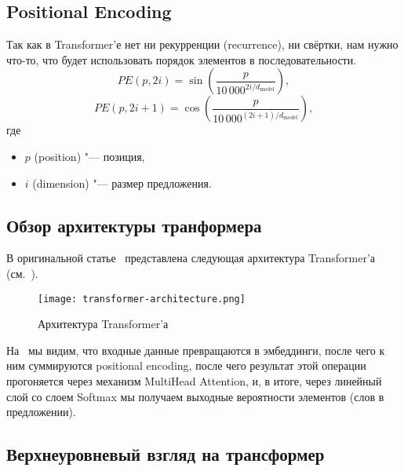 \subsection{Positional Encoding}


Так как в Transformer'е нет ни рекурренции (recurrence), ни свёртки, нам нужно что-то, что будет использовать порядок элементов в последовательности.
\begin{equation}\label{positional-encoding}%
  PE(p, 2i) = \sin\left( \frac{p}{10\,000^{2i / d_{\text{model}}}} \right),
\end{equation}
\begin{equation}\label{positional-encoding-2}%
  PE(p, 2i + 1) = \cos\left( \frac{p}{10\,000^{(2i + 1) / d_{\text{model}}}} \right),
\end{equation}
где
\begin{itemize}%
  \item $p$ (position) "--- позиция,
  \item $i$ (dimension) "--- размер предложения.
\end{itemize}


\subsection{Обзор архитектуры транформера}


В оригинальной статье~\cite{Transformer2019} представлена следующая архитектура Transformer'а (см.~).
\begin{figure}[H]%
  \centering
  \texttt{[image: transformer-architecture.png]}
  \caption{Архитектура Transformer'а}
  \label{transformer-architecture}
\end{figure}

На~ мы видим, что входные данные превращаются в эмбеддинги, после чего к ним суммируются positional encoding, после чего результат этой операции прогоняется через механизм MultiHead Attention, и, в итоге, через линейный слой со слоем Softmax мы получаем выходные вероятности элементов (слов в предложении).


\subsection{Верхнеуровневый взгляд на трансформер}


